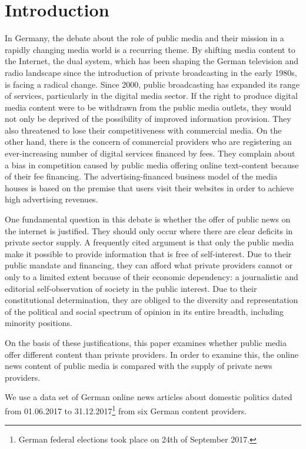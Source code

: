 \documentclass[12pt,a4paper,notitlepage]{article}
\begin{document}
\section{Introduction}

In Germany, the debate about the role of public media and their mission in a rapidly changing media world is a recurring theme. By shifting media content to the Internet, the dual system, which has been shaping the German television and radio landscape since the introduction of private broadcasting in the early 1980s, is facing a radical change. Since 2000, public broadcasting has expanded its range of services, particularly in the digital media sector. If the right to produce digital media content were to be withdrawn from the public media outlets, they would not only be deprived of the possibility of improved information provision. They also threatened to lose their competitiveness with commercial media. On the other hand, there is the concern of commercial providers who are registering an ever-increasing number of digital services financed by fees. They complain about a bias in competition caused by public media offering online text-content because of their fee financing. The advertising-financed business model of the media houses is based on the premise that users visit their websites in order to achieve high advertising revenues.

One fundamental question in this debate is whether the offer of public news on the internet is justified. They should only occur where there are clear deficits in private sector supply. A frequently cited argument is that only the public media make it possible to provide information that is free of self-interest. Due to their public mandate and financing, they can afford what private providers cannot or only to a limited extent because of their economic dependency: a journalistic and editorial self-observation of society in the public interest. Due to their constitutional determination, they are obliged to the diversity and representation of the political and social spectrum of opinion in its entire breadth, including minority positions.

On the basis of these justifications, this paper examines whether public media offer different content than private providers. In order to examine this, the online news content of public media is compared with the supply of private news providers.

We use a data set of German online news articles about domestic politics dated from 01.06.2017 to 31.12.2017\footnote{German federal elections took place on 24th of September 2017.} from six German content providers. 
\end{document}
